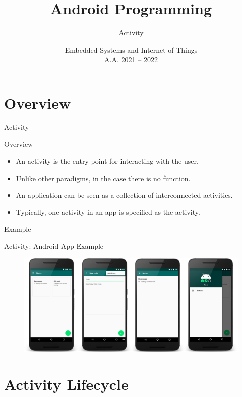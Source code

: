 \documentclass{beamer}
\title[Android -- 1B -- Activity]{Android Programming}
\subtitle{Activity}
\date[ver. 1.0 (20220505)]{Embedded Systems and Internet of Things\\A.A. 2021 -- 2022}
\begin{document}
\begin{frame}
\titlepage
\end{frame}



\section{Overview}

\begin{frame}{Activity}
  \begin{block}{Overview}
    \begin{itemize}
      \item An activity is the entry point for interacting with the user.
      \item Unlike other paradigms, in the case there is no  function.
      \item An application can be seen as a collection of interconnected activities.
      \item Typically, one activity in an app is specified as the  activity.
    \end{itemize}
  \end{block}
  \begin{exampleblock}{Example}
    
  \end{exampleblock}
\end{frame}

\begin{frame}{Activity: Android App Example}
\begin{figure}
\includegraphics[width=\linewidth]{figures/activity-ex.png}
\end{figure}
\end{frame}

\section{Activity Lifecycle}
\end{document}
